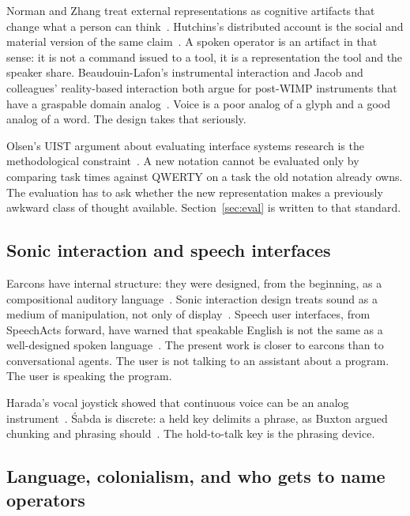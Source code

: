 \documentclass[manuscript, review, anonymous]{acmart}
\begin{document}
Norman and Zhang treat external representations as cognitive artifacts that change what a person can think~\cite{Norman1991Artifacts,Zhang1994Representations}. Hutchins's distributed account is the social and material version of the same claim~\cite{Hutchins1995Cognition,Hutchins1995Distributed}. A spoken operator is an artifact in that sense: it is not a command issued to a tool, it is a representation the tool and the speaker share. Beaudouin-Lafon's instrumental interaction and Jacob and colleagues' reality-based interaction both argue for post-WIMP instruments that have a graspable domain analog~\cite{Beaudouin2000CHI,Jacob2008CHI}. Voice is a poor analog of a glyph and a good analog of a word. The design takes that seriously.

Olsen's UIST argument about evaluating interface systems research is the methodological constraint~\cite{Olsen2007UIST}. A new notation cannot be evaluated only by comparing task times against QWERTY on a task the old notation already owns. The evaluation has to ask whether the new representation makes a previously awkward class of thought available. Section~\ref{sec:eval} is written to that standard.

\subsection{Sonic interaction and speech interfaces}

Earcons have internal structure: they were designed, from the beginning, as a compositional auditory language~\cite{Blattner1989Earcons}. Sonic interaction design treats sound as a medium of manipulation, not only of display~\cite{Franinovic2013Sonic}. Speech user interfaces, from SpeechActs forward, have warned that speakable English is not the same as a well-designed spoken language~\cite{Yankelovich1995CHI,Pearl2016VUI,Corbett2016VUIs}. The present work is closer to earcons than to conversational agents. The user is not talking to an assistant about a program. The user is speaking the program.

Harada's vocal joystick showed that continuous voice can be an analog instrument~\cite{Harada2006Joystick}. {\'S}abda is discrete: a held key delimits a phrase, as Buxton argued chunking and phrasing should~\cite{Buxton1986Chunking}. The hold-to-talk key is the phrasing device.

\subsection{Language, colonialism, and who gets to name operators}
\end{document}
